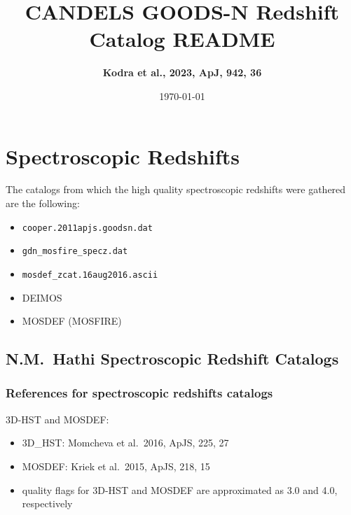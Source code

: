 \documentclass[12pt,onecolumn]{article}
\title{\textbf{CANDELS GOODS-N Redshift Catalog README}}
\author{\textbf{Kodra et al., 2023, ApJ, 942, 36}}
\date{\today}
\begin{document}
\maketitle




\section*{Spectroscopic Redshifts}

The catalogs from which the high quality spectroscopic redshifts were gathered are the following:
\begin{itemize}
\item \texttt{cooper.2011apjs.goodsn.dat}
\item \texttt{gdn\_mosfire\_specz.dat}
\item \texttt{mosdef\_zcat.16aug2016.ascii}
\item DEIMOS
\item MOSDEF (MOSFIRE)
\end{itemize}

\subsection*{N.M.~Hathi Spectroscopic Redshift Catalogs}
\subsubsection*{References for spectroscopic redshifts catalogs}

\noindent 3D-HST and MOSDEF:
\begin{itemize}
\item 3D\_HST: Momcheva et al.\ 2016, ApJS, 225, 27
\item MOSDEF: Kriek et al.\ 2015, ApJS, 218, 15
\item quality flags for 3D-HST and MOSDEF are approximated as 3.0 and 4.0, respectively
\end{itemize}
\end{document}
